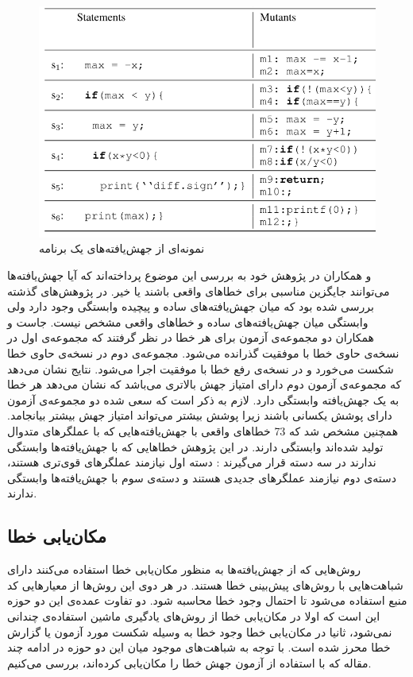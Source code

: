 \begin{figure}[H]
	\centering
	\includegraphics[width=.6\textwidth]{img/mutants.PNG}
	\caption{ نمونه‌ای از جهش‌یافته‌های یک برنامه \cite{moon2014ask}}
	\label{fig:mutant}
\end{figure}
 و همکاران در پژوهش خود به بررسی این موضوع پرداخته‌اند که آیا جهش‌یافته‌ها می‌توانند جایگزین مناسبی برای خطاهای واقعی باشند یا خیر\cite{just2014mutants}. در پژوهش‌های گذشته بررسی شده بود که میان جهش‌یافته‌های ساده و پیچیده وابستگی وجود دارد ولی وابستگی میان جهش‌یافته‌های ساده و خطاهای واقعی مشخص نیست. جاست و همکاران دو مجموعه‌ی آزمون برای هر خطا در نظر گرفتند که مجموعه‌ی اول در نسخه‌ی حاوی خطا با موفقیت گذرانده می‌شود. مجموعه‌ی دوم در نسخه‌ی حاوی خطا شکست می‌خورد و در نسخه‌ی رفع خطا با موفقیت اجرا می‌شود. نتایج نشان می‌دهد که مجموعه‌ی آزمون دوم دارای امتیاز جهش بالاتری می‌باشد که نشان می‌دهد هر خطا به یک جهش‌یافته وابستگی دارد. لازم به ذکر است که سعی شده  دو مجموعه‌ی آزمون دارای پوشش یکسانی باشند زیرا پوشش بیشتر می‌تواند امتیاز جهش بیشتر بیانجامد. همچنین مشخص شد که  
73 \lr{\%} 
خطاهای واقعی با جهش‌یافته‌هایی که  با عملگرهای متدوال تولید شده‌اند وابستگی دارند. در این پژوهش خطاهایی که با جهش‌یافته‌ها وابستگی ندارند در سه دسته قرار می‌گیرند : دسته اول نیازمند عملگرهای قوی‌تری هستند، دسته‌ی دوم نیازمند عملگرهای جدیدی هستند و دسته‌ی سوم با جهش‌یافته‌ها وابستگی ندارند.\\
\subsection{مکان‌یابی خطا}
روش‌هایی که از جهش‌یافته‌ها به منظور مکان‌یابی خطا استفاده می‌کنند دارای شباهت‌هایی با روش‌های پیش‌بینی خطا هستند. در هر دوی این روش‌ها از معیارهایی  کد منبع استفاده می‌شود تا احتمال وجود خطا محاسبه شود. دو تفاوت عمده‌ی این دو حوزه این است که اولا در مکان‌یابی خطا از روش‌های یادگیری ماشین استفاده‌ی چندانی نمی‌شود، ثانیا در مکان‌یابی خطا وجود خطا به وسیله شکست مورد آزمون یا گزارش خطا محرز شده است. با توجه به شباهت‌های موجود میان این دو حوزه در ادامه چند مقاله که با استفاده از آزمون جهش خطا را مکان‌یابی کرده‌اند، بررسی می‌کنیم. \\

